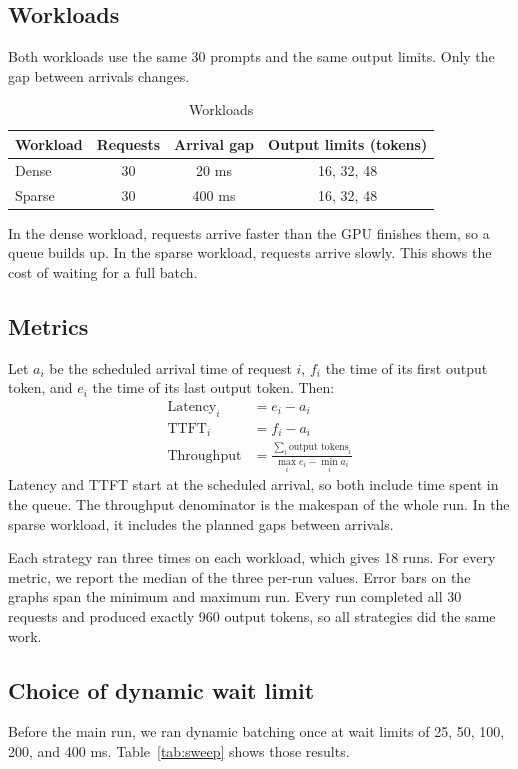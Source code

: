 \documentclass[12pt,a4paper]{article}
\begin{document}
\subsection{Workloads}
Both workloads use the same 30 prompts and the same output limits. Only the gap between arrivals changes.

\begin{table}[H]
\centering
\caption{Workloads}
\begin{tabular}{lccc}
\toprule
\textbf{Workload} & \textbf{Requests} & \textbf{Arrival gap} & \textbf{Output limits (tokens)} \\
\midrule
Dense & 30 & 20 ms & 16, 32, 48 \\
Sparse & 30 & 400 ms & 16, 32, 48 \\
\bottomrule
\end{tabular}
\end{table}

In the dense workload, requests arrive faster than the GPU finishes them, so a queue builds up. In the sparse workload, requests arrive slowly. This shows the cost of waiting for a full batch.

\subsection{Metrics}
Let $a_i$ be the scheduled arrival time of request $i$, $f_i$ the time of its first output token, and $e_i$ the time of its last output token. Then:
\begin{align*}
\text{Latency}_i &= e_i - a_i \\
\text{TTFT}_i &= f_i - a_i \\
\text{Throughput} &= \frac{\sum_i \text{output tokens}_i}{\max_i e_i - \min_i a_i}
\end{align*}
Latency and TTFT start at the scheduled arrival, so both include time spent in the queue. The throughput denominator is the makespan of the whole run. In the sparse workload, it includes the planned gaps between arrivals.

Each strategy ran three times on each workload, which gives 18 runs. For every metric, we report the median of the three per-run values. Error bars on the graphs span the minimum and maximum run. Every run completed all 30 requests and produced exactly 960 output tokens, so all strategies did the same work.

\subsection{Choice of dynamic wait limit}
Before the main run, we ran dynamic batching once at wait limits of 25, 50, 100, 200, and 400 ms. Table~\ref{tab:sweep} shows those results.
\end{document}
